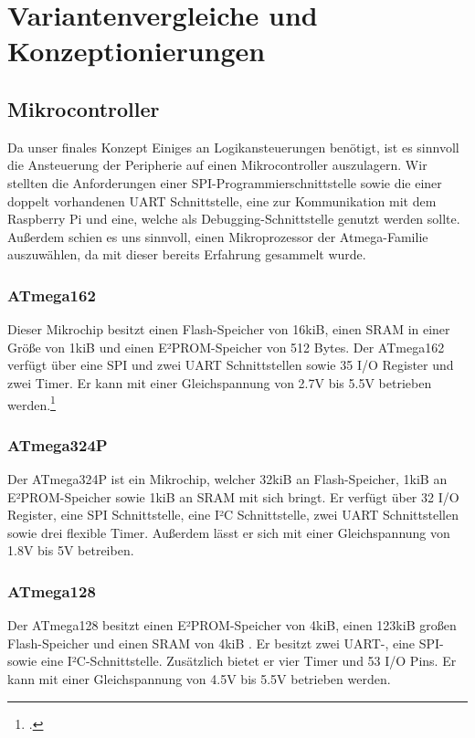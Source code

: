 \section{Variantenvergleiche und Konzeptionierungen}

\subsection{Mikrocontroller}
Da unser finales Konzept Einiges an Logikansteuerungen benötigt, ist es sinnvoll die Ansteuerung der Peripherie auf einen Mikrocontroller auszulagern.
Wir stellten die Anforderungen einer SPI-Programmierschnittstelle sowie die einer doppelt vorhandenen UART Schnittstelle, eine zur Kommunikation mit dem Raspberry Pi und eine, welche als Debugging-Schnittstelle genutzt werden sollte.
Außerdem schien es uns sinnvoll, einen Mikroprozessor der Atmega-Familie auszuwählen, da mit dieser bereits Erfahrung gesammelt wurde.

\subsubsection{ATmega162}
Dieser Mikrochip besitzt einen Flash-Speicher von 16kiB, einen SRAM in einer Größe von 1kiB und einen E²PROM-Speicher von 512 Bytes.
Der ATmega162 verfügt über eine SPI und zwei UART Schnittstellen sowie 35 I/O Register und zwei Timer.
Er kann mit einer Gleichspannung von 2.7V bis 5.5V betrieben werden.\footcite{AVR Typen}

\subsubsection{ATmega324P}
Der ATmega324P ist ein Mikrochip, welcher 32kiB an Flash-Speicher, 1kiB an E²PROM-Speicher sowie 1kiB an SRAM mit sich bringt.
Er verfügt über 32 I/O Register, eine SPI Schnittstelle, eine I²C Schnittstelle, zwei UART Schnittstellen sowie drei flexible Timer.
Außerdem lässt er sich mit einer Gleichspannung von 1.8V bis 5V betreiben. \footnotemark[1]

\subsubsection{ATmega128}
Der ATmega128 besitzt einen E²PROM-Speicher von 4kiB, einen 123kiB großen Flash-Speicher und einen SRAM von 4kiB .
Er besitzt zwei UART-, eine SPI- sowie eine I²C-Schnittstelle.
Zusätzlich bietet er vier Timer und 53 I/O Pins.
Er kann mit einer Gleichspannung von 4.5V bis 5.5V betrieben werden. \footnotemark[1]

